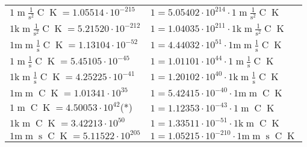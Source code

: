 \begin{center}
\begin{longtable}{l l}
{\color{black}$1 \bm{\mathrm{ }}{\operatorname{m}}\frac1{\operatorname{s}^2}{\operatorname{C}}{\operatorname{K}} = 1.05514\cdot10^{-215} $}   & {\color{black}$ 1 = 5.05402\cdot10^{214} \cdot 1 \bm{\mathrm{ }}{\operatorname{m}}\frac1{\operatorname{s}^2}{\operatorname{C}}{\operatorname{K}}$}  \\
{\color{gray}$1 \bm{\mathrm{ k}}{\operatorname{m}}\frac1{\operatorname{s}^2}{\operatorname{C}}{\operatorname{K}} = 5.21520\cdot10^{-212} $}   & {\color{gray}$ 1 = 1.04035\cdot10^{211} \cdot 1 \bm{\mathrm{ k}}{\operatorname{m}}\frac1{\operatorname{s}^2}{\operatorname{C}}{\operatorname{K}}$}  \\
{\color{gray}$1 \bm{\mathrm{ m}}{\operatorname{m}}\frac1{\operatorname{s}}{\operatorname{C}}{\operatorname{K}} = 1.13104\cdot10^{-52} $}   & {\color{gray}$ 1 = 4.44032\cdot10^{51} \cdot 1 \bm{\mathrm{ m}}{\operatorname{m}}\frac1{\operatorname{s}}{\operatorname{C}}{\operatorname{K}}$}  \\
{\color{black}$1 \bm{\mathrm{ }}{\operatorname{m}}\frac1{\operatorname{s}}{\operatorname{C}}{\operatorname{K}} = 5.45105\cdot10^{-45} $}   & {\color{black}$ 1 = 1.01101\cdot10^{44} \cdot 1 \bm{\mathrm{ }}{\operatorname{m}}\frac1{\operatorname{s}}{\operatorname{C}}{\operatorname{K}}$}  \\
{\color{gray}$1 \bm{\mathrm{ k}}{\operatorname{m}}\frac1{\operatorname{s}}{\operatorname{C}}{\operatorname{K}} = 4.25225\cdot10^{-41} $}   & {\color{gray}$ 1 = 1.20102\cdot10^{40} \cdot 1 \bm{\mathrm{ k}}{\operatorname{m}}\frac1{\operatorname{s}}{\operatorname{C}}{\operatorname{K}}$}  \\
{\color{gray}$1 \bm{\mathrm{ m}}{\operatorname{m}}{}{\operatorname{C}}{\operatorname{K}} = 1.01341\cdot10^{35} $}   & {\color{gray}$ 1 = 5.42415\cdot10^{-40} \cdot 1 \bm{\mathrm{ m}}{\operatorname{m}}{}{\operatorname{C}}{\operatorname{K}}$}  \\
{\color{black}$1 \bm{\mathrm{ }}{\operatorname{m}}{}{\operatorname{C}}{\operatorname{K}} = 4.50053\cdot10^{42} $}\quad(*) & {\color{black}$ 1 = 1.12353\cdot10^{-43} \cdot 1 \bm{\mathrm{ }}{\operatorname{m}}{}{\operatorname{C}}{\operatorname{K}}$}  \\
{\color{gray}$1 \bm{\mathrm{ k}}{\operatorname{m}}{}{\operatorname{C}}{\operatorname{K}} = 3.42213\cdot10^{50} $}   & {\color{gray}$ 1 = 1.33511\cdot10^{-51} \cdot 1 \bm{\mathrm{ k}}{\operatorname{m}}{}{\operatorname{C}}{\operatorname{K}}$}  \\
{\color{gray}$1 \bm{\mathrm{ m}}{\operatorname{m}}{\operatorname{s}}{\operatorname{C}}{\operatorname{K}} = 5.11522\cdot10^{205} $}   & {\color{gray}$ 1 = 1.05215\cdot10^{-210} \cdot 1 \bm{\mathrm{ m}}{\operatorname{m}}{\operatorname{s}}{\operatorname{C}}{\operatorname{K}}$}  \\

\end{longtable}
\end{center}

